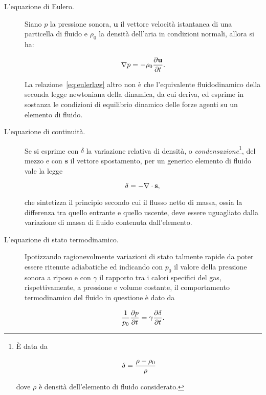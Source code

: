\begin{description}
  \item[L'equazione di Eulero.]  Siano $p$ la pressione sonora, $\mathbf{u}$ il vettore velocit\`a
        istantanea di una particella di fluido e $\rho_0$ la densit\`a dell'aria in condizioni normali,
	allora si ha:

        \begin{equation}
	  \label{eq:eulerlaw}
	  \nabla p = - \rho_0 \frac{\partial \mathbf{u}}{\partial t}.\\
	\end{equation}

	La relazione~\ref{eq:eulerlaw} altro non \`e che l'equivalente fluidodinamico della seconda legge
        newtoniana della dinamica, da cui deriva, ed esprime in sostanza le condizioni di equilibrio
	dinamico delle forze agenti su un elemento di fluido.

 \item[L'equazione di continuit\`a.] Se si esprime con $\delta$ la variazione relativa di densit\`a, o 
      \emph{condensazione}\footnote{\`E data da

          \begin{displaymath}
	     \delta = \frac{\rho - \rho_0}{\rho}\\
          \end{displaymath}

	  dove $\rho$ \`e densit\`a dell'elemento di fluido considerato.}, del mezzo
      e con $\mathbf{s}$ il vettore spostamento, per un generico elemento di fluido vale la legge

      \begin{equation}
	\label{eq:continuity}
	\delta = - \nabla \cdot \mathbf{s},\\
      \end{equation}

      che sintetizza il principio secondo cui il flusso netto di massa, ossia la differenza tra quello
      entrante e quello uscente, deve essere uguagliato dalla variazione di massa di fluido
      contenuta dall'elemento.

 \item[L'equazione di stato termodinamico.] Ipotizzando ragionevolmente variazioni di stato talmente
      rapide da poter essere ritenute adiabatiche ed indicando con $p_0$ il valore della pressione sonora
      a riposo e con $\gamma$ il rapporto tra i calori specifici del gas, rispettivamente, a pressione e
      volume costante, il comportamento termodinamico del fluido in questione \`e dato da

      \begin{equation}
	\label{eq:statelaw}
	\frac{1}{p_0} \frac{\partial p}{\partial t} = \gamma \frac{\partial \delta}{\partial t}.\\
      \end{equation}

\end{description}

